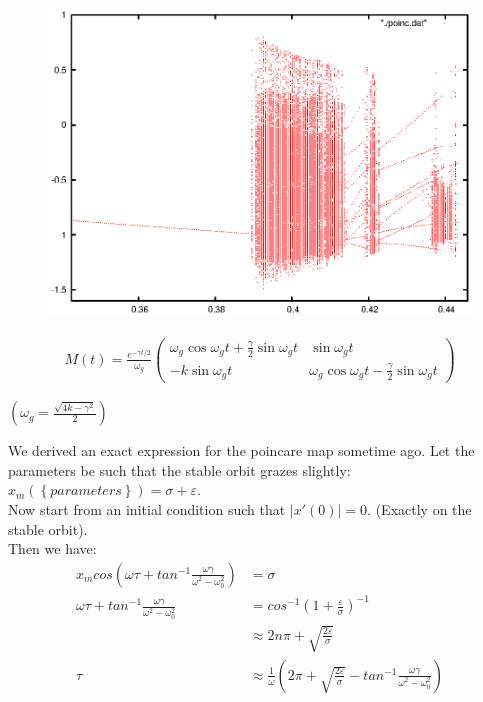 \documentclass[xcolor=x11names,compress]{beamer}
\renewcommand{\(}{\begin{columns}}
\renewcommand{\)}{\end{columns}}
\newcommand{\<}[1]{\begin{column}{#1}}
\renewcommand{\>}{\end{column}}
\begin{document}
\begin{frame}
\begin{figure}
\caption{}
\begin{center}
\includegraphics[width=0.9\columnwidth]{poinc-bf-f}
\end{center}
\end{figure}
\end{frame}

\begin{frame}[label=homogen-evol]
\begin{eqnarray}
M(t)=\frac{e^{-\gamma t/2}}{\omega_g}
\begin{pmatrix}
\omega_g\cos{\omega_g t}+\frac{\gamma}{2}\sin{\omega_g t} & \sin{\omega_g t}\\
-k\sin{\omega_g t} & \omega_g\cos{\omega_g t}-\frac{\gamma}{2}\sin{\omega_g t}
\end{pmatrix}
\end{eqnarray}

$(\omega_g=\frac{\sqrt{4k-\gamma^2}}{2})$
\hyperlink{BackFromM}{}
\end{frame}

\begin{frame}[label=new_poincare_slide]
We derived an exact expression for the poincare map sometime ago.  
\hyperlink{poincare_slide}{}
Let the parameters be such that the stable orbit grazes slightly:
$x_m(\left\{parameters\right\})=\sigma+\varepsilon$.  \\

Now start from an initial condition such that $\left|x'(0)\right|=0$.  
(Exactly on the stable orbit).\\

Then we have:
\begin{align*}
x_mcos\left(\omega \tau+tan^{-1}\frac{\omega \gamma}{\omega^2-\omega_0^2}\right)&=\sigma\\
\omega \tau+tan^{-1}\frac{\omega \gamma}{\omega^2-\omega_0^2}&=cos^{-1}\left(1+\frac{\varepsilon}{\sigma}\right)^{-1}\\
&\approx2n\pi+\sqrt{\frac{2\varepsilon}{\sigma}}\\
\tau&\approx \frac{1}{\omega}\left(2\pi+\sqrt{\frac{2\varepsilon}{\sigma}}-tan^{-1}\frac{\omega \gamma}{\omega^2-\omega_0^2}\right)
\end{align*}
\end{frame}
\end{document}
